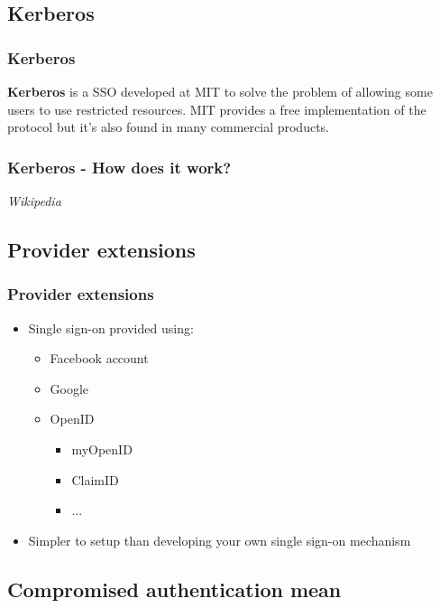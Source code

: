 \subsection{Kerberos}

\begin{frame}
\frametitle{Kerberos}
\textbf{Kerberos} is a SSO developed at MIT to solve the problem of allowing
some users to use restricted resources.
MIT provides a free implementation of the protocol but it's also found in many
commercial products.
\end{frame}

\begin{frame}
\frametitle{Kerberos - How does it work?}
\textit{Wikipedia}
\end{frame}

\subsection{Provider extensions}

\begin{frame}
\frametitle{Provider extensions}
\begin{itemize}
\item Single sign-on provided using:
	\begin{itemize}
	\item Facebook account
	\item Google
	\item OpenID
		\begin{itemize}
		\item myOpenID
		\item ClaimID
		\item ...
		\end{itemize}
	\end{itemize}
\item Simpler to setup than developing your own single sign-on mechanism
\end{itemize}
\end{frame}

\subsection{Compromised authentication mean}

